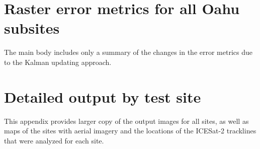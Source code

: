 
\chapter{Raster error metrics for all Oahu subsites}

The main body includes only a summary of the changes in the error metrics due to the Kalman updating approach.


\chapter{Detailed output by test site}\label{ch:subsite-appendix}
This appendix provides larger copy of the output images for all sites, as well as maps of the sites with aerial imagery and the locations of the ICESat-2 tracklines that were analyzed for each site.
